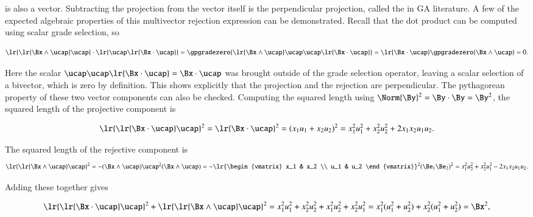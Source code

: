 is also a vector.
Subtracting the projection from the vector itself is the perpendicular projection, called the  in GA literature.
A few of the expected algebraic properties of this multivector rejection expression can be demonstrated.
Recall that the dot product can be computed using scalar grade selection, so

\begin{dmath}\label{eqn:SimpleProducts2:720}
\lr{ \lr{ \Bx \wedge \ucap } \ucap } \cdot \lr{ \ucap \lr{ \Bx \cdot \ucap } }
=
\gpgradezero{ \lr{ \Bx \wedge \ucap } \ucap \ucap \lr{ \Bx \cdot \ucap } }
=
\lr{ \Bx \cdot \ucap }
\gpgradezero{ \Bx \wedge \ucap }
= 0.
\end{dmath}

Here the scalar \( \ucap \ucap \lr{ \Bx \cdot \ucap } = \Bx \cdot \ucap \) was brought outside of the grade selection operator, leaving a scalar selection of a bivector, which is zero by definition.
This shows explicitly that the projection and the rejection are perpendicular.
The pythagorean property of these two vector components can also be checked.
Computing the squared length using \( \Norm{\By}^2 = \By \cdot \By = \By^2 \), the squared length of the projective component is

\begin{dmath}\label{eqn:SimpleProducts2:740}
\lr{ \lr{\Bx \cdot \ucap } \ucap }^2
=
\lr{\Bx \cdot \ucap }^2
=
(x_1 u_1 + x_2 u_2)^2
=
x_1^2 u_1^2 + x_2^2 u_2^2 + 2 x_1 x_2 u_1 u_2.
\end{dmath}

The squared length of the rejective component is
\begin{dmath}\label{eqn:SimpleProducts2:760}
\lr{ \lr{\Bx \wedge \ucap } \ucap }^2
=
-(\Bx \wedge \ucap) \ucap^2 (\Bx \wedge \ucap)
=
-
\lr{\begin{vmatrix}
   x_1 & x_2 \\
   u_1 & u_2
\end{vmatrix}}^2
(\Be_1 \Be_2)^2
=
x_1^2 u_2^2 + x_2^2 u_1^2 - 2 x_1 x_2 u_1 u_2.
\end{dmath}

Adding these together gives

\begin{dmath}\label{eqn:SimpleProducts2:780}
\lr{ \lr{\Bx \cdot \ucap } \ucap }^2 + \lr{ \lr{\Bx \wedge \ucap } \ucap }^2
=
x_1^2 u_1^2 + x_2^2 u_2^2
+x_1^2 u_2^2 + x_2^2 u_1^2
=
x_1^2 ( u_1^2 + u_2^2 )
+
x_2^2 ( u_1^2 + u_2^2 )
=
\Bx^2,
\end{dmath}

